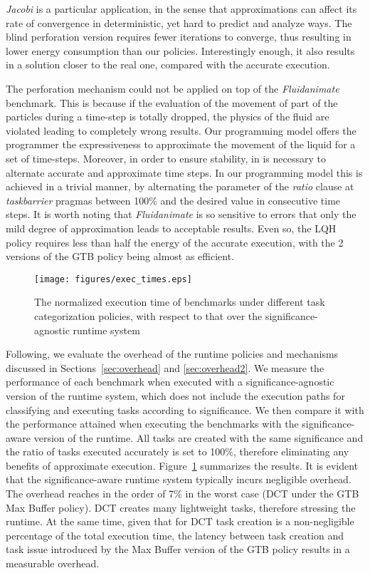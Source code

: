 \textit{Jacobi} is a particular application, in the sense that approximations can affect its rate of convergence in deterministic, yet hard to predict and analyze ways. The blind perforation version requires fewer  iterations to converge, thus resulting in lower energy consumption than our policies. Interestingly enough, it also results in a solution closer to the real one, compared with the accurate execution.

The perforation mechanism could not be applied on top of the \textit{Fluidanimate} benchmark. This is because if the evaluation of the movement of part of the particles during a time-step is totally dropped, the physics of the fluid are violated leading to completely wrong results. Our programming model offers the programmer the expressiveness to approximate the movement of the liquid for a set of time-steps. Moreover, in order to ensure stability, in is necessary to alternate accurate and approximate time steps. In our programming model this is achieved in a trivial manner, by alternating the parameter of the {\it ratio} clause at {\it taskbarrier} pragmas between 100\% and the desired value in consecutive time steps. It is worth noting that \textit{Fluidanimate} is so sensitive to errors that only the mild degree of approximation leads to acceptable results. Even so, the LQH policy requires less than half the energy of the accurate execution, with the 2 versions of the GTB policy being almost as efficient. 

\begin{figure}[tb]
\centering
\texttt{[image: figures/exec\_times.eps]}
\caption{The normalized execution time of benchmarks under different task categorization policies, with respect to that over the significance-agnostic runtime system}\label{fig:execution_times}
\end{figure}

Following, we evaluate the overhead of the runtime policies and mechanisms discussed in Sections~\ref{sec:overhead} and \ref{sec:overhead2}. We measure the performance of each benchmark when executed with a significance-agnostic version of the runtime system, which does not include the execution paths for classifying and executing tasks according to significance. We then compare it with the performance attained when executing the benchmarks with the significance-aware version of the runtime. All tasks are created with the same significance and the ratio of tasks executed accurately is set to 100\%, therefore eliminating any benefits of approximate execution. Figure~\ref{fig:execution_times} summarizes the results. It is evident that the significance-aware runtime system typically incurs negligible overhead. The overhead reaches in the order of 7\% in the worst case (DCT under the GTB Max Buffer policy). DCT creates many lightweight tasks, therefore stressing the runtime. At the same time, given that for DCT task creation is a non-negligible percentage of the total execution time, the latency between task creation and task issue introduced by the Max Buffer version of the GTB policy results in a measurable overhead.


